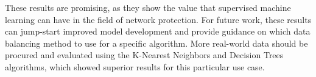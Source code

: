 \documentclass[conference]{IEEEtran}
\begin{document}
These results are promising, as they show the value that supervised machine learning can have in the field of network protection. For future work, these results can jump-start improved model development and provide guidance on which data balancing method to use for a specific algorithm. More real-world data should be procured and evaluated using the K-Nearest Neighbors and Decision Trees algorithms, which showed superior results for this particular use case.



\end{document}
